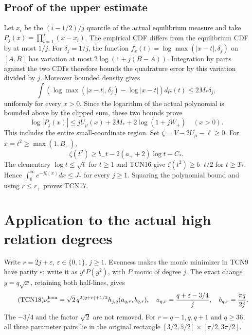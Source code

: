 \documentclass[11pt,a4paper]{article}
\begin{document}
\subsection{Proof of the upper estimate}
Let $x_i$ be the $(i-1/2)/j$ quantile of the actual equilibrium
measure and take $P_j(x)=\prod_{i=1}^j(x-x_i)$. The empirical
CDF differs from the equilibrium CDF by at most $1/j$.
For $\delta_j=1/j$, the function
$f_x(t)=\log\max(|x-t|,\delta_j)$ on $[A,B]$ has variation at
most $2\log(1+j(B-A))$. Integration by parts against the two CDFs
therefore bounds the quadrature error by this variation divided by $j$.
Moreover bounded density gives
\[
 \int(\log\max(|x-t|,\delta_j)-\log|x-t|)d\mu(t)
 \le2M_*\delta_j,
\]
uniformly for every $x>0$. Since the logarithm of the actual polynomial
is bounded above by the clipped sum, these two bounds prove
\[
 \log|P_j(x)|\le jU_\mu(x)+2M_*+2\log(1+jW_+)\quad(x>0).
\]
This includes the entire small-coordinate region. Set
$\zeta=V-2U_\mu-\ell\ge0$. For $x=t^2\ge\max(1,B_+)$,
\[
 \zeta(t^2)\ge b_-t-2(a_++2)\log t-C_*.
\]
The elementary $\log t\le\sqrt t$ for $t\ge1$ and TCN16 give
$\zeta(t^2)\ge b_-t/2$ for $t\ge T_*$. Hence
$\int_0^\infty e^{-j\zeta(x)}dx\le J_*$ for every $j\ge1$.
Squaring the polynomial bound and using $r\le r_+$ proves TCN17.

\section{Application to the actual high relation degrees}

Write $r=2j+\varepsilon$, $\varepsilon\in\{0,1\}$, $j\ge1$.
Evenness makes the monic minimizer in TCN9 have parity $\varepsilon$:
write it as $y^\varepsilon P(y^2)$, with $P$ monic of degree $j$.
The exact change $y=q\sqrt x$, retaining both half-lines, gives
\begin{equation}\tag{TCN18}
 \nu_r^{\rm hom}
 =\sqrt2\,q^{2(q+r)+1/2}h_{j,q}(a_{q,r},b_{q,r}),\quad
 a_{q,r}=\frac{q+\varepsilon-3/4}{j},\quad
 b_{q,r}=\frac{\pi q}{2j}.
\end{equation}
The $-3/4$ and the factor $\sqrt2$ are not removed.
For $r=q-1,q,q+1$ and $q\ge36$, all three parameter pairs lie in the
original rectangle $[3/2,5/2]\times[\pi/2,3\pi/2]$.
\end{document}
